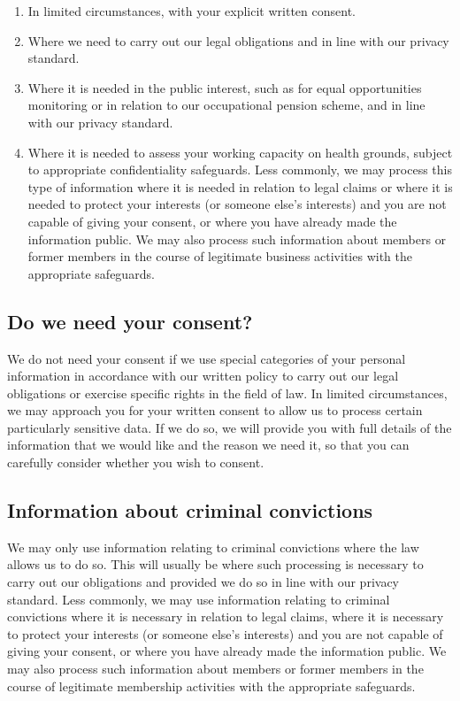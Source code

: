 \documentclass[12pt]{article}
\begin{document}
\begin{enumerate}
\item In limited circumstances, with your explicit written consent.
\item Where we need to carry out our legal obligations and in line with our privacy standard.
\item Where it is needed in the public interest, such as for equal opportunities monitoring or in relation to our occupational pension scheme, and in line with our privacy standard.
\item Where it is needed to assess your working capacity on health grounds, subject to appropriate confidentiality safeguards.
Less commonly, we may process this type of information where it is needed in relation to legal claims or where it is needed to protect your interests (or someone else's interests) and you are not capable of giving your consent, or where you have already made the information public. We may also process such information about members or former members in the course of legitimate business activities with the appropriate safeguards.
\end{enumerate}

\subsection{Do we need your consent?}
We do not need your consent if we use special categories of your personal information in accordance with our written policy to carry out our legal obligations or exercise specific rights in the field of law. In limited circumstances, we may approach you for your written consent to allow us to process certain particularly sensitive data. If we do so, we will provide you with full details of the information that we would like and the reason we need it, so that you can carefully consider whether you wish to consent. 

\subsection{Information about criminal convictions}
We may only use information relating to criminal convictions where the law allows us to do so. This will usually be where such processing is necessary to carry out our obligations and provided we do so in line with our privacy standard.
Less commonly, we may use information relating to criminal convictions where it is necessary in relation to legal claims, where it is necessary to protect your interests (or someone else's interests) and you are not capable of giving your consent, or where you have already made the information public. 
We may also process such information about members or former members in the course of legitimate membership activities with the appropriate safeguards.
\end{document}
